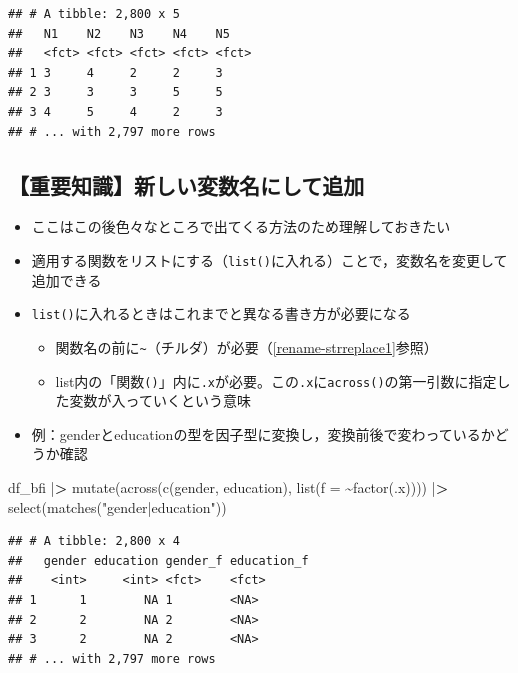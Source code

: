 \documentclass[
  xelatex,ja=standard, b5paper]{bxjsbook}
\newenvironment{Shaded}{\begin{snugshade}}{\end{snugshade}}
\newcommand{\AttributeTok}[1]{\textcolor[rgb]{0.77,0.63,0.00}{#1}}
\newcommand{\ErrorTok}[1]{\textcolor[rgb]{0.64,0.00,0.00}{\textbf{#1}}}
\newcommand{\FunctionTok}[1]{\textcolor[rgb]{0.00,0.00,0.00}{#1}}
\newcommand{\NormalTok}[1]{#1}
\newcommand{\SpecialCharTok}[1]{\textcolor[rgb]{0.00,0.00,0.00}{#1}}
\newcommand{\StringTok}[1]{\textcolor[rgb]{0.31,0.60,0.02}{#1}}
\providecommand{\tightlist}{%
  \setlength{\itemsep}{0pt}\setlength{\parskip}{0pt}}
\begin{document}
\begin{verbatim}
## # A tibble: 2,800 x 5
##   N1    N2    N3    N4    N5   
##   <fct> <fct> <fct> <fct> <fct>
## 1 3     4     2     2     3    
## 2 3     3     3     5     5    
## 3 4     5     4     2     3    
## # ... with 2,797 more rows
\end{verbatim}

\hypertarget{mu-across-list}{%
\subsection{【重要知識】新しい変数名にして追加}\label{mu-across-list}}

\begin{itemize}
\tightlist
\item
  ここはこの後色々なところで出てくる方法のため理解しておきたい
\item
  適用する関数をリストにする（\texttt{list()}に入れる）ことで，変数名を変更して追加できる
\item
  \texttt{list()}に入れるときはこれまでと異なる書き方が必要になる

  \begin{itemize}
  \tightlist
  \item
    関数名の前に\texttt{\textasciitilde{}}（チルダ）が必要（\ref{rename-strreplace1}参照）
  \item
    list内の「関数\texttt{()}」内に\texttt{.x}が必要。この\texttt{.x}に\texttt{across()}の第一引数に指定した変数が入っていくという意味
  \end{itemize}
\item
  例：genderとeducationの型を因子型に変換し，変換前後で変わっているかどうか確認
\end{itemize}

\begin{Shaded}
\begin{Highlighting}[]
\NormalTok{df\_bfi }\SpecialCharTok{|}\ErrorTok{\textgreater{}}
  \FunctionTok{mutate}\NormalTok{(}\FunctionTok{across}\NormalTok{(}\FunctionTok{c}\NormalTok{(gender, education),}
                \FunctionTok{list}\NormalTok{(}\AttributeTok{f =} \SpecialCharTok{\textasciitilde{}}\FunctionTok{factor}\NormalTok{(.x)))) }\SpecialCharTok{|}\ErrorTok{\textgreater{}} 
  \FunctionTok{select}\NormalTok{(}\FunctionTok{matches}\NormalTok{(}\StringTok{"gender|education"}\NormalTok{))   }
\end{Highlighting}
\end{Shaded}

\begin{verbatim}
## # A tibble: 2,800 x 4
##   gender education gender_f education_f
##    <int>     <int> <fct>    <fct>      
## 1      1        NA 1        <NA>       
## 2      2        NA 2        <NA>       
## 3      2        NA 2        <NA>       
## # ... with 2,797 more rows
\end{verbatim}
\end{document}
